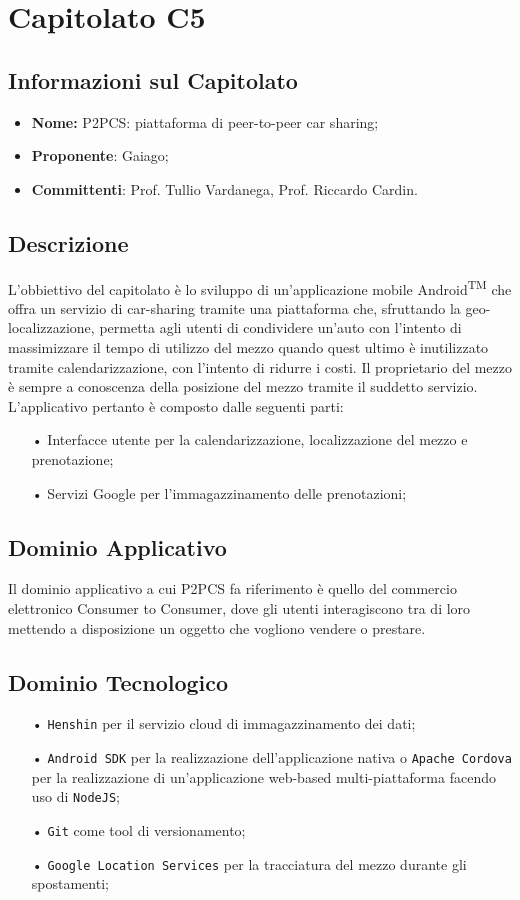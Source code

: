 \section{Capitolato C5}
\subsection{Informazioni sul Capitolato}
\begin{itemize}
	\item \textbf{Nome:} P2PCS: piattaforma di peer-to-peer car sharing;
	\item \textbf{Proponente}: Gaiago;
	\item \textbf{Committenti}: Prof. Tullio Vardanega, Prof. Riccardo Cardin.
\end{itemize}
\subsection{Descrizione}
L'obbiettivo del capitolato è lo sviluppo di un'applicazione mobile Android\textsuperscript{TM} che offra un servizio di car-sharing tramite una piattaforma che, sfruttando la geo-localizzazione, permetta agli utenti di condividere un'auto con l'intento di massimizzare il tempo di utilizzo del mezzo quando quest ultimo è inutilizzato tramite calendarizzazione, con l'intento di ridurre i costi. Il proprietario del mezzo è sempre a conoscenza della posizione del mezzo tramite il suddetto servizio. L'applicativo pertanto è composto dalle seguenti parti:
\begin{itemize}
\item[•] Interfacce utente per la calendarizzazione, localizzazione del mezzo e prenotazione;
\item[•] Servizi Google per l'immagazzinamento delle prenotazioni;
\end{itemize}
\subsection{Dominio Applicativo}
Il dominio applicativo a cui P2PCS fa riferimento è quello del commercio elettronico Consumer to Consumer, dove gli utenti interagiscono tra di loro mettendo a disposizione un oggetto che vogliono vendere o prestare.
\subsection{Dominio Tecnologico}
\begin{itemize}
\item[•] \texttt{Henshin} per il servizio cloud di immagazzinamento dei dati;
\item[•] \texttt{Android SDK} per la realizzazione dell'applicazione nativa o \texttt{Apache Cordova} per la realizzazione di un'applicazione web-based multi-piattaforma facendo uso di \texttt{NodeJS};
\item[•] \texttt{Git} come tool di versionamento;
\item[•] \texttt{Google Location Services} per la tracciatura del mezzo durante gli spostamenti;
\end{itemize}
